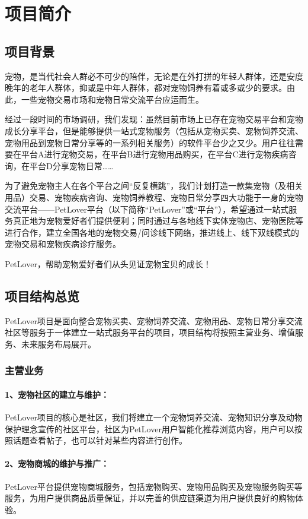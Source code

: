 \documentclass[a4paper]{ctexart}
\begin{document}
\section{项目简介}

\subsection{项目背景}
宠物，是当代社会人群必不可少的陪伴，无论是在外打拼的年轻人群体，还是安度晚年的老年人群体，抑或是中年人群体，都对宠物饲养有着或多或少的要求。由此，一些宠物交易市场和宠物日常交流平台应运而生。

经过一段时间的市场调研，我们发现：虽然目前市场上已存在宠物交易平台和宠物成长分享平台，但是能够提供一站式宠物服务（包括从宠物买卖、宠物饲养交流、宠物用品到宠物日常分享等的一系列相关服务）的软件平台少之又少。用户往往需要在平台A进行宠物交易，在平台B进行宠物用品购买，在平台C进行宠物疾病咨询，在平台D分享宠物日常……

为了避免宠物主人在各个平台之间“反复横跳”，我们计划打造一款集宠物（及相关用品）交易、宠物疾病咨询、宠物饲养教程、宠物日常分享四大功能于一身的宠物交流平台——PetLover平台（以下简称“PetLover”或“平台”），希望通过一站式服务真正地为宠物爱好者们提供便利；同时通过与各地线下实体宠物店、宠物医院等进行合作，建立全国各地的宠物交易/问诊线下网络，推进线上、线下双线模式的宠物交易和宠物疾病诊疗服务。

PetLover，帮助宠物爱好者们从头见证宠物宝贝的成长！

\subsection{项目结构总览}
PetLover项目是面向整合宠物买卖、宠物饲养交流、宠物用品、宠物日常分享交流社区等服务于一体建立一站式服务平台的项目，项目结构将按照主营业务、增值服务、未来服务布局展开。

\subsubsection{主营业务}
\paragraph{1、宠物社区的建立与维护：}PetLover项目的核心是社区，我们将建立一个宠物饲养交流、宠物知识分享及动物保护理念宣传的社区平台，社区为PetLover用户智能化推荐浏览内容，用户可以按照话题查看帖子，也可以针对某些内容进行创作。
\paragraph{2、宠物商城的维护与推广：}PetLover平台提供宠物商城服务，包括宠物购买、宠物用品购买及宠物服务购买等服务，为用户提供商品质量保证，并以完善的供应链渠道为用户提供良好的购物体验。
\end{document}
